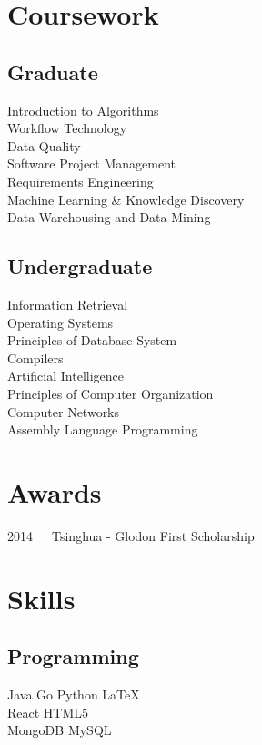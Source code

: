 \documentclass[]{resume_en}
\begin{document}
\begin{minipage}[t]{0.33\textwidth}

\section{Coursework}
\subsection{Graduate}
Introduction to Algorithms\\
Workflow Technology\\
Data Quality\\
Software Project Management\\
Requirements Engineering\\
Machine Learning \& Knowledge Discovery\\
Data Warehousing and Data Mining\\
\sectionsep

\subsection{Undergraduate}
Information Retrieval \\
Operating Systems \\
Principles of Database System \\
Compilers \\
Artificial Intelligence \\
Principles of Computer Organization \\
Computer Networks \\
Assembly Language Programming \\
\sectionsep


\section{Awards} 
2014~~~Tsinghua - Glodon First Scholarship
\sectionsep


\section{Skills}
\subsection{Programming}
Java \textbullet{} Go \textbullet{} Python \textbullet{} \LaTeX\ \\
React \textbullet{} HTML5\\
MongoDB \textbullet{} MySQL
\sectionsep

%
%

\end{minipage} 
\end{document}
